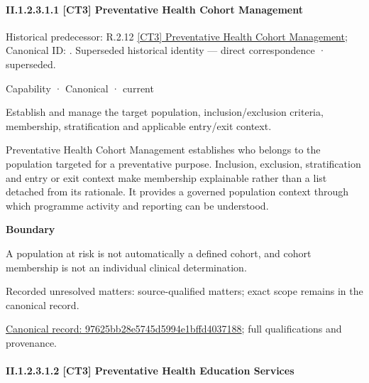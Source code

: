 \paragraph*{II.1.2.3.1.1 [CT3] Preventative Health Cohort Management}
\label{navigation:II.1.2.3.1.1}

{\small Historical predecessor: R.2.12 \hyperref[element:fef479f0fd5048b19b2aec770f0233fe]{[CT3] Preventative Health Cohort Management}; Canonical ID: \texttt{}. Superseded historical identity — direct correspondence · superseded.}\par
\label{element:97625bb28e5745d5994e1bffd4037188}
{\small Capability · Canonical · current}\par

Establish and manage the target population, inclusion/exclusion criteria, membership, stratification and applicable entry/exit context.



Preventative Health Cohort Management establishes who belongs to the population targeted for a preventative purpose. Inclusion, exclusion, stratification and entry or exit context make membership explainable rather than a list detached from its rationale. It provides a governed population context through which programme activity and reporting can be understood.



\textbf{Boundary}



A population at risk is not automatically a defined cohort, and cohort membership is not an individual clinical determination.


{\small Recorded unresolved matters: source-qualified matters; exact scope remains in the canonical record.}\par
{\footnotesize \href{../../../../continuum/strategy/capability/97625bb28e5745d5994e1bffd4037188.md}{Canonical record: 97625bb28e5745d5994e1bffd4037188}; full qualifications and provenance.}\par
\paragraph*{II.1.2.3.1.2 [CT3] Preventative Health Education Services}
\label{navigation:II.1.2.3.1.2}

